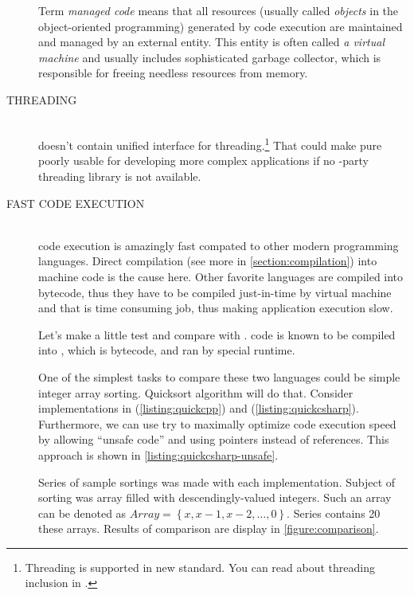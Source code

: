 \begin{description}
\begin{fdocextra}
Term \textit{managed code} means that all resources (usually called \emph{objects} in the object-oriented programming) generated by code execution are maintained and managed by an external entity. This entity is often called \emph{a virtual machine} and usually includes sophisticated garbage collector, which is responsible for freeing needless resources from memory.
\end{fdocextra}

\item[THREADING\ts{\textcolor{red}{bad}}]\hfill \\
\cpp doesn't contain unified interface for threading.\footnote{Threading is supported in new  standard. You can read about threading inclusion in \citep[p.~1114-1160]{various:cppstandard}.} That could make pure \cpp poorly usable for developing more complex applications if no -party threading library is not available.

\item[FAST CODE EXECUTION\ts{\textcolor{YellowOrange}{great}}]\hfill \\
\cpp code execution is amazingly fast compated to other modern programming languages. Direct compilation (see more in \autoref{section:compilation})  into machine code is the cause here. Other favorite languages are compiled into bytecode, thus they have to be compiled just-in-time by virtual machine and that is time consuming job, thus making application execution slow.

Let's make a little test and compare \cpp with \csharp. \csharp code is known to be compiled into , which is bytecode, and ran by special runtime.

One of the simplest tasks to compare these two languages could be simple integer array sorting. Quicksort algorithm will do that. Consider implementations in \cpp (\autoref{listing:quickcpp}) and \csharp(\autoref{listing:quickcsharp}). Furthermore, we can use try to maximally optimize \csharp code execution speed by  allowing \enquote{unsafe code} and using pointers instead of references. This approach is shown in \autoref{listing:quickcsharp-unsafe}.

Series of sample sortings was made with each implementation. Subject of sorting was array filled with descendingly-valued integers. Such an array can be denoted as $Array = \left\{ x, x-1, x-2, \ldots, 0 \right\}$. Series contains 20 these arrays. Results of comparison are display in \autoref{figure:comparison}.


\end{description}
